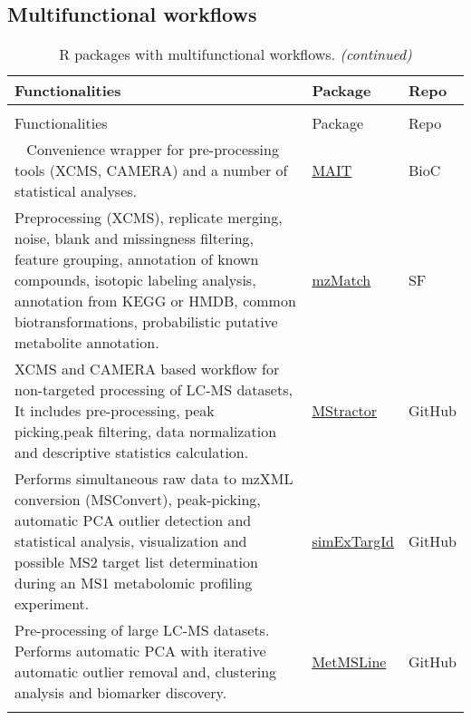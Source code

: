 \documentclass[]{article}
\begin{document}
\newpage

\hypertarget{multifunctional-workflows}{%
\subsection{Multifunctional workflows}\label{multifunctional-workflows}}

\begin{longtable}{>{\raggedright\arraybackslash}p{30em}>{\raggedright\arraybackslash}p{10em}>{\raggedright\arraybackslash}p{3em}}
\caption{\label{tab:tab9}R packages with multifunctional workflows.}\\
\toprule
Functionalities & Package & Repo\\
\midrule
\endfirsthead
\caption[]{\label{tab:tab9}R packages with multifunctional workflows. \textit{(continued)}}\\
\toprule
Functionalities & Package & Repo\\
\midrule
\endhead
\
\endfoot
\bottomrule
\endlastfoot
\rowcolor{gray!6}  Convenience wrapper for pre-processing tools (XCMS, CAMERA) and a number of statistical analyses. & \href{https://www.bioconductor.org/packages/release/bioc/html/MAIT.html}{MAIT} & BioC\\
Preprocessing (XCMS), replicate merging, noise, blank and missingness filtering, feature grouping, annotation of known compounds, isotopic labeling analysis, annotation from KEGG or HMDB, common biotransformations, probabilistic putative metabolite annotation. & \href{http://mzmatch.sourceforge.net/}{mzMatch} & SF\\
\rowcolor{gray!6}  XCMS and CAMERA based workflow for non-targeted processing of LC-MS datasets, It includes pre-processing, peak picking,peak filtering, data normalization and descriptive statistics calculation. & \href{https://github.com/search?q=MStractor}{MStractor} & GitHub\\
Performs simultaneous raw data to mzXML conversion (MSConvert), peak-picking, automatic PCA outlier detection and statistical analysis, visualization and possible MS2 target list determination during an MS1 metabolomic profiling experiment. & \href{https://github.com/WMBEdmands/simExTargId}{simExTargId} & GitHub\\
\rowcolor{gray!6}  Pre-processing of large LC-MS datasets. Performs automatic PCA with iterative automatic outlier removal and, clustering analysis and biomarker discovery. & \href{https://github.com/WMBEdmands/MetMSLine}{MetMSLine} & GitHub\\
\addlinespace

\end{longtable}
\end{document}
